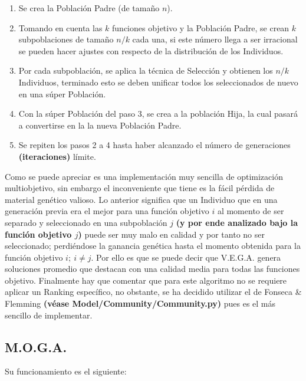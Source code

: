\documentclass[class=report, crop=false]{standalone}
\begin{document}
\begin{enumerate} 
\item Se crea la Población Padre (de tamaño \(n\)).
\item Tomando en cuenta las \(k\) funciones objetivo y la Población Padre, se crean \(k\) subpoblaciones de tamaño \(n/k\) cada una, si este número llega a ser irracional se pueden hacer ajustes con respecto de la distribución de los Individuos.
\item Por cada subpoblación, se aplica la técnica de Selección y obtienen los \(n/k\) Individuos, terminado esto se deben unificar todos los seleccionados de nuevo en una súper Población.
\item Con la súper Población del paso 3, se crea a la población Hija, la cual pasará a convertirse en la la nueva Población Padre.
\item Se repiten los pasos 2 a 4 hasta haber alcanzado el número de generaciones \textbf{(iteraciones)} límite.
\end{enumerate}

Como se puede apreciar es una implementación muy sencilla 
de optimización multiobjetivo, sin embargo el inconveniente 
que tiene es la fácil pérdida de material genético valioso.\break
Lo anterior significa que un Individuo que en una generación 
previa era el mejor para una función objetivo \(i\) al momento 
de ser separado y seleccionado en una subpoblación \(j\) \textbf{(y por ende analizado bajo la función objetivo \(j\))} 
puede ser muy malo en calidad y por tanto no ser seleccionado;
perdiéndose la ganancia genética hasta el momento obtenida para 
la función objetivo \(i;\ i \neq j\).\medskip\break
Por ello es que se puede decir que V.E.G.A. genera soluciones 
promedio que destacan con una calidad media para todas las 
funciones objetivo.\medskip\break
Finalmente hay que comentar que para este algoritmo no se requiere 
aplicar un Ranking específico, no obstante, se ha decidido utilizar 
el de Fonseca \& Flemming \textbf{(véase Model/Community/Community.py)} 
pues es el más sencillo de implementar.

\subsection{M.O.G.A.}
Su funcionamiento es el siguiente:
\end{document}
